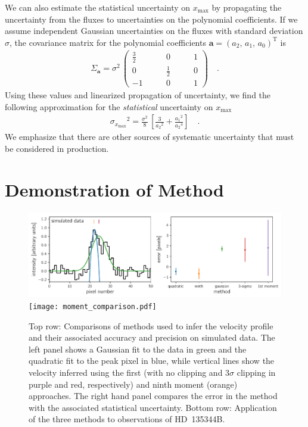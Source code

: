 \documentclass[rnaas]{aastex62}
\newcommand{\T}{\ensuremath{\mathrm{T}}}
\newcommand{\bvec}[1]{{\ensuremath{\boldsymbol{#1}}}}
\begin{document}
We can also estimate the statistical uncertainty on $x_\mathrm{max}$ by
propagating the uncertainty from the fluxes to uncertainties on the polynomial
coefficients.
If we assume independent Gaussian uncertainties on the fluxes with standard
deviation $\sigma$, the covariance matrix for the polynomial coefficients
$\bvec{a} = {(a_2,\,a_1,\,a_0)}^\T$ is
\begin{eqnarray}
\Sigma_\bvec{a} = \sigma^2\,\left(\begin{array}{ccc}
\frac{3}{2} \quad & \quad 0 \quad &\quad 1 \\
0\quad &\quad \frac{1}{2}\quad &\quad 0 \\
-1\quad &\quad 0\quad &\quad 1
\end{array}\right)\quad.
\end{eqnarray}
Using these values and linearized propagation of uncertainty, we find the
following approximation for the \emph{statistical} uncertainty on
$x_\mathrm{max}$
\begin{eqnarray}
{\sigma_{x_\mathrm{max}}}^2 = \frac{\sigma^2}{8}\,\left[
    \frac{3}{{a_2}^2} + \frac{{a_1}^2}{{a_2}^4}
\right]\quad.
\end{eqnarray}
We emphasize that there are other sources of systematic uncertainty that must
be considered in production.

\section{Demonstration of Method}

\begin{figure}[htbp]
\centering
\includegraphics[width=\textwidth]{../notebooks/simulated-spectrum.pdf}
\texttt{[image: moment\_comparison.pdf]}
\caption{Top row: Comparisons of methods used to infer the velocity profile and their associated accuracy and precision on simulated data. The left panel shows a Gaussian fit to the data in green and the quadratic fit to the peak pixel in blue, while vertical lines show the velocity inferred using the first (with no clipping and $3\sigma$ clipping in purple and red, respectively) and ninth moment (orange) approaches. The right hand panel compares the error in the method with the associated statistical uncertainty. Bottom row: Application of the three methods to observations of HD~135344B. \label{figure}}
\end{figure}
\end{document}
